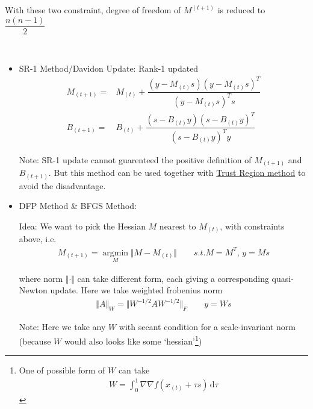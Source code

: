     With these two constraint, degree of freedom of $ M^{(t+1)} $ is reduced to $ \dfrac{n(n-1)}{2} $
    
    \\




\begin{itemize}[topsep=2pt,itemsep=0pt]
    \item SR-1 Method/Davidon Update: Rank-1 updated 
    \begin{align}
        M_{(t+1)}=&M_{(t)}+\dfrac{(y-M_{(t)}s)(y-M_{(t)}s)^T}{(y-M_{(t)}s)^Ts}\\
        B_{(t+1)}=&B_{(t)}+\dfrac{(s-B_{(t)}y)(s-B_{(t)}y)^T}{(s-B_{(t)}y)^Ty}
    \end{align}

    Note: SR-1 update cannot guarenteed the positive definition of $ M_{(t+1)} $ and $ B_{(t+1)} $. But this method can be used together with \hyperlink{TrustRegionMethod}{Trust Region method} to avoid the disadvantage.
    \item DFP Method \& BFGS Method: 
    
    Idea: We want to pick the Hessian $ M $ nearest to $ M_{(t)} $, with constraints above, i.e.
    \begin{align}
        M_{(t+1)}=\mathop{\arg\min}\limits_{M}\Vert M-M_{(t)} \Vert  \qquad s.t.  M=M^T,\, y=Ms
    \end{align}

    where norm $ \Vert \cdot \Vert  $ can take different form, each giving a corresponding quasi-Newton update. Here we take weighted frobenius norm
    \begin{align}
        \Vert A \Vert_W=\Vert W^{-1/2}AW^{-1/2} \Vert_F   \qquad y=Ws
    \end{align}
    
    Note: Here we take any $ W $ with secant condition for a scale-invariant norm (because $ W $ would also looks like some `hessian'\footnote{One of possible form of $ W $ can take
    \begin{align}
        W=\int _0^1\nabla\nabla f\left(x_{(t)}+\tau s \right) \,\mathrm{d}\tau
    \end{align}
    })


\end{itemize}

